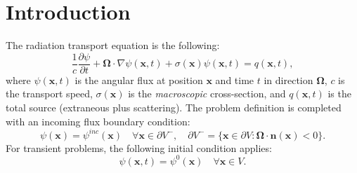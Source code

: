 \section{Introduction}
The radiation transport equation is the following:
\begin{equation}\label{tr}
	\frac{1}{c}\frac{\partial \psi}{\partial t} + \mathbf{\Omega}\cdot\nabla\psi(\mathbf{x},t)
      + \sigma(\mathbf{x})\psi(\mathbf{x},t) = q(\mathbf{x},t),
\end{equation}
where $\psi(\mathbf{x},t)$ is the angular flux at position $\mathbf{x}$ and time
$t$ in direction $\mathbf{\Omega}$, $c$ is the transport speed, $\sigma(\mathbf{x})$
is the \emph{macroscopic} cross-section, and $q(\mathbf{x},t)$ is the
total source (extraneous plus scattering).
The problem definition is completed with an incoming flux boundary condition:
\begin{equation}
   \psi(\mathbf{x}) = \psi^{inc}(\mathbf{x})  \quad \forall \mathbf{x}\in \partial V^-,
      \quad \partial V^- = \{\mathbf{x}\in\partial V: \mathbf{\Omega}\cdot\mathbf{n}(\mathbf{x})<0\}.
\end{equation}
For transient problems, the following initial condition applies:
\begin{equation}
   \psi(\mathbf{x},t) = \psi^0(\mathbf{x})  \quad \forall \mathbf{x}\in V.
\end{equation}